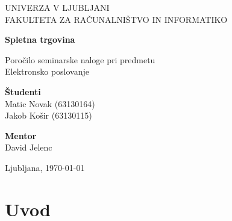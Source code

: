 \documentclass[a4paper,12pt]{report}
\newcommand{\naslov}     {Spletna trgovina}
\newcommand{\prviavtor}  {Matic Novak}
\newcommand{\prviindeks} {63130164}
\newcommand{\drugiavtor} {Jakob Košir}
\newcommand{\drugiindeks}{63130115}
\newcommand{\kraj}       {Ljubljana}
\begin{document}
\begin{titlepage}
	\begin{center}
	{UNIVERZA V LJUBLJANI\\[10pt] 
	FAKULTETA ZA RAČUNALNIŠTVO IN INFORMATIKO}

	\vspace{65mm}

	{\Large\textbf{\naslov}}

	\vspace{10mm}

	{\large Poročilo seminarske naloge pri predmetu\\[10pt] Elektronsko poslovanje}

	\vfill
	\vspace{60mm}

\hspace{20mm}
\begin{minipage}[t]{70mm}
	{\bf Študenti}\\
	{\prviavtor} ({\prviindeks})\\ 
	{\drugiavtor} ({\drugiindeks})\\
\end{minipage}
\begin{minipage}[t]{50mm}
	{\bf Mentor}\\
	David Jelenc
\end{minipage}

	\vspace{35mm}

	{	\kraj, \today}
	\end{center}
\end{titlepage}


\tableofcontents


\chapter{Uvod}
\end{document}
